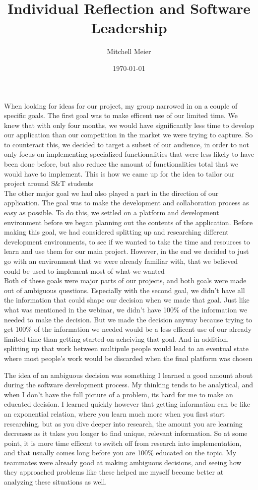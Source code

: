\documentclass[14pt]{article}
\title{Individual Reflection and Software Leadership}
\author{Mitchell Meier}
\date{\today}
\begin{document}
\maketitle

When looking for ideas for our project, my group narrowed in on a couple of specific goals. The first goal was to make efficent use of our limited time. We knew that with only four months, we would have significantly less time to develop our application than our competition in the market we were trying to capture. So to counteract this, we decided to target a subset of our audience, in order to not only focus on implementing specialized functionalities that were less likely to have been done before, but also reduce the amount of functionalities total that we would have to implement. This is how we came up for the idea to tailor our project around S\&T students \\

The other major goal we had also played a part in the direction of our application. The goal was to make the development and collaboration process as easy as possible. To do this, we settled on a platform and development environment before we began planning out the contents of the application. Before making this goal, we had considered splitting up and researching different development environments, to see if we wanted to take the time and resources to learn and use them for our main project. However, in the end we decided to just go with an environment that we were already familiar with, that we believed could be used to implement most of what we wanted \\

Both of these goals were major parts of our projects, and both goals were made out of ambiguous questions. Especially with the second goal, we didn't have all the information that could shape our decision when we made that goal. Just like what was mentioned in the webinar, we didn't have 100\% of the information we needed to make the decision. But we made the decision anyway because trying to get 100\% of the information we needed would be a less efficent use of our already limited time than getting started on acheiving that goal. And in addition, splitting up that work between multipule people would lead to an eventual state where most people's work would be discarded when the final platform was chosen \pagebreak

The idea of an ambiguous decision was something I learned a good amount about during the software development process. My thinking tends to be analytical, and when I don't have the full picture of a problem, its hard for me to make an educated decision. I learned quickly however that getting information can be like an exponential relation, where you learn much more when you first start researching, but as you dive deeper into research, the amount you are learning decreases as it takes you longer to find unique, relevant information. So at some point, it is more time efficent to switch off from research into implementation, and that usually comes long before you are 100\% educated on the topic. My teammates were already good at making ambiguous decisions, and seeing how they approached problems like these helped me myself become better at analyzing these situations as well.
\end{document}

